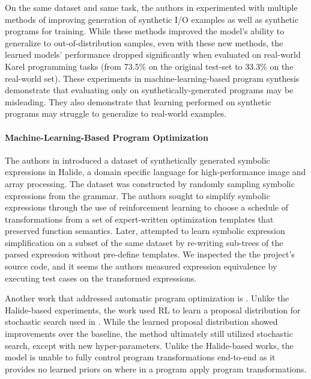 \documentclass{article}
\begin{document}
On the same dataset and same task, the authors in \cite{shin2018synthetic} experimented with multiple methods of improving generation of synthetic I/O examples as well as synthetic programs for training. While these methods improved the model's ability to generalize to out-of-distribution samples, even with these new methods, the learned models' performance dropped significantly when evaluated on real-world Karel programming tasks (from 73.5\% on the original test-set to 33.3\% on the real-world set). These experiments in machine-learning-based program synthesis demonstrate that evaluating only on synthetically-generated programs may be misleading. They also demonstrate that learning performed on synthetic programs may struggle to generalize to real-world examples. 

\paragraph{Machine-Learning-Based Program Optimization} The authors in \cite{chen2019learning} introduced a dataset of synthetically generated symbolic expressions in Halide, a domain specific language for high-performance image and array processing. The dataset was constructed by randomly sampling symbolic expressions from the grammar. The authors sought to simplify symbolic expressions through the use of reinforcement learning to choose a schedule of transformations from a set of expert-written optimization templates that preserved function semantics. Later, \cite{shi2020} attempted to learn symbolic expression simplification on a subset of the same dataset by re-writing sub-trees of the parsed expression without pre-define templates. We inspected the the project's source code, and it seems the authors measured expression equivalence by executing test cases on the transformed expressions. 

Another work that addressed automatic program optimization is \cite{bunel2016learning}. Unlike the Halide-based experiments, the work used RL to learn a proposal distribution for stochastic search used in \cite{schkufza2013stochastic}. While the learned proposal distribution showed improvements over the baseline, the method ultimately still utilized stochastic search, except with new hyper-parameters. Unlike the Halide-based works, the model is unable to fully control program transformations end-to-end as it provides no learned priors on where in a program  apply program transformations.
\end{document}
